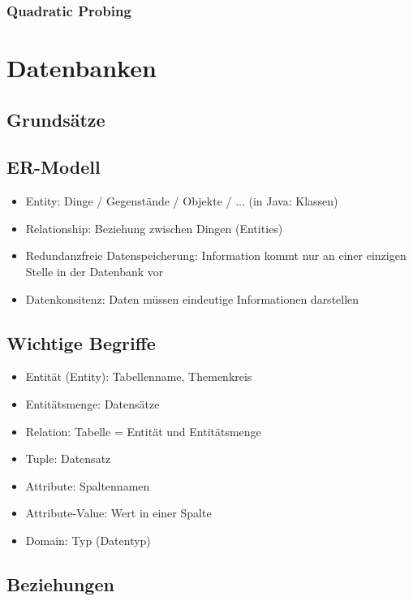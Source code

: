 \documentclass{article}
\begin{document}
\subsubsection{Quadratic Probing}


\section{Datenbanken}
\subsection{Grundsätze}
\subsection{ER-Modell}

\begin{itemize}
  \item Entity: Dinge / Gegenstände / Objekte / ... (in Java: Klassen)
  \item Relationship: Beziehung zwischen Dingen (Entities)
  \item Redundanzfreie Datenspeicherung: Information kommt nur an einer einzigen Stelle in der Datenbank vor
  \item Datenkonsitenz: Daten müssen eindeutige Informationen darstellen
\end{itemize}

\subsection{Wichtige Begriffe}

\begin{itemize}
  \item Entität (Entity): Tabellenname, Themenkreis
  \item Entitätsmenge: Datensätze
  \item Relation: Tabelle = Entität und Entitätsmenge
  \item Tuple: Datensatz
  \item Attribute: Spaltennamen
  \item Attribute-Value: Wert in einer Spalte
  \item Domain: Typ (Datentyp)
\end{itemize}

\subsection{Beziehungen}
\end{document}
